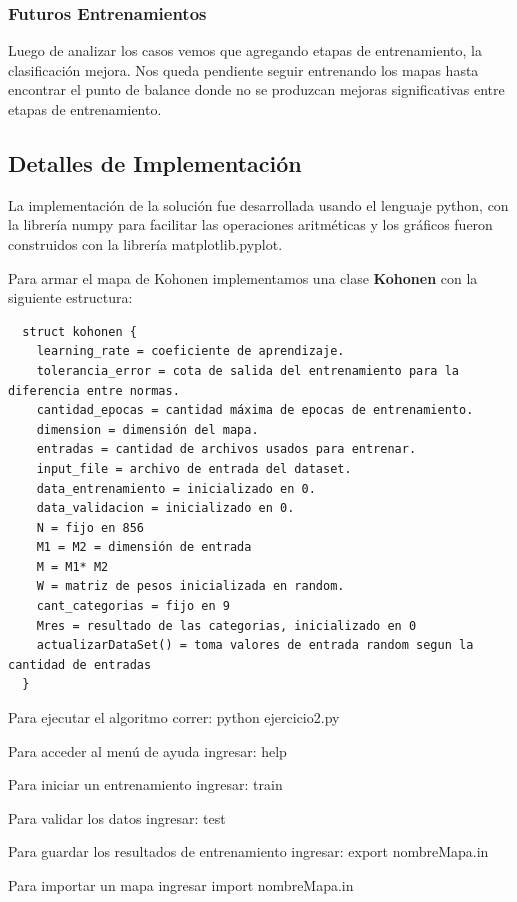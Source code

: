 \subsubsection{Futuros Entrenamientos}

Luego de analizar los casos vemos que agregando etapas de entrenamiento, la clasificación mejora.
Nos queda pendiente seguir entrenando los mapas hasta encontrar el punto de balance donde no se
produzcan mejoras significativas entre etapas de entrenamiento.


\subsection{Detalles de Implementación}

La implementación de la solución fue desarrollada usando el lenguaje python,
con la librería numpy para facilitar las operaciones aritméticas y los gráficos
fueron construidos con la librería matplotlib.pyplot.

Para armar el mapa de Kohonen implementamos una clase \textbf{Kohonen} con la siguiente estructura:

\begin{lstlisting}
  struct kohonen {
    learning_rate = coeficiente de aprendizaje.
    tolerancia_error = cota de salida del entrenamiento para la diferencia entre normas.
    cantidad_epocas = cantidad máxima de epocas de entrenamiento.
    dimension = dimensión del mapa.
    entradas = cantidad de archivos usados para entrenar.
    input_file = archivo de entrada del dataset.
    data_entrenamiento = inicializado en 0.
    data_validacion = inicializado en 0.
    N = fijo en 856
    M1 = M2 = dimensión de entrada
    M = M1* M2 
    W = matriz de pesos inicializada en random.  
    cant_categorias = fijo en 9
    Mres = resultado de las categorias, inicializado en 0
    actualizarDataSet() = toma valores de entrada random segun la cantidad de entradas
  }
\end{lstlisting}

Para ejecutar el algoritmo correr: python ejercicio2.py

Para acceder al menú de ayuda ingresar: help

Para iniciar un entrenamiento ingresar: train

Para validar los datos ingresar: test

Para guardar los resultados de entrenamiento ingresar: export nombreMapa.in

Para importar un mapa ingresar import nombreMapa.in

